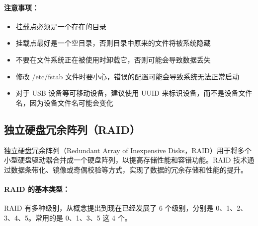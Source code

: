 \documentclass[12pt,UTF8]{ctexbook}
\begin{document}
\paragraph{注意事项：}
\begin{itemize}
    \item 挂载点必须是一个存在的目录
    \item 挂载点最好是一个空目录，否则目录中原来的文件将被系统隐藏
    \item 不要在文件系统正在被使用时卸载它，否则可能会导致数据丢失
    \item 修改 /etc/fstab 文件时要小心，错误的配置可能会导致系统无法正常启动
    \item 对于 USB 设备等可移动设备，建议使用 UUID 来标识设备，而不是设备文件名，因为设备文件名可能会变化
\end{itemize}

\subsection{独立硬盘冗余阵列（RAID）}
\label{raid}

独立硬盘冗余阵列（Redundant Array of Inexpensive Disks，RAID）用于将多个小型硬盘驱动器合并成一个硬盘阵列，以提高存储性能和容错功能。RAID 技术通过数据条带化、镜像或奇偶校验等方式，实现了数据的冗余存储和性能的提升。

\paragraph{RAID 的基本类型：}
RAID 有多种级别，从概念提出到现在已经发展了 6 个级别，分别是 0、1、2、3、4、5。常用的是 0、1、3、5 这 4 个。
\end{document}
